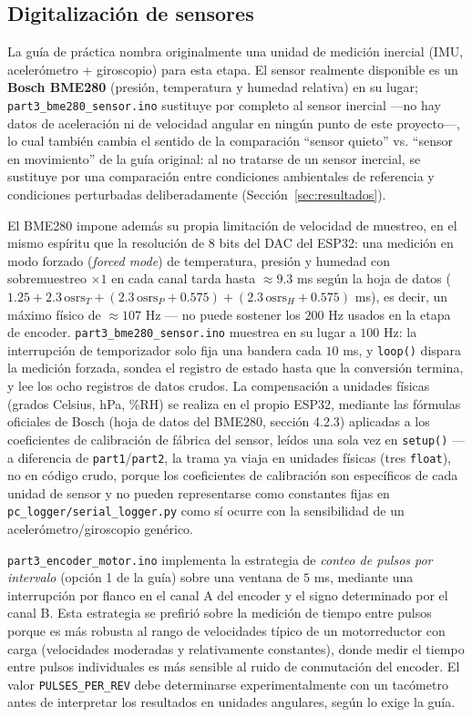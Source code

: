 \subsection{Digitalización de sensores}

La guía de práctica nombra originalmente una unidad de medición inercial (IMU, acelerómetro + giroscopio) para esta etapa. El sensor realmente disponible es un \textbf{Bosch BME280} (presión, temperatura y humedad relativa) en su lugar; \texttt{part3\_bme280\_sensor.ino} sustituye por completo al sensor inercial —no hay datos de aceleración ni de velocidad angular en ningún punto de este proyecto—, lo cual también cambia el sentido de la comparación ``sensor quieto'' vs. ``sensor en movimiento'' de la guía original: al no tratarse de un sensor inercial, se sustituye por una comparación entre condiciones ambientales de referencia y condiciones perturbadas deliberadamente (Sección~\ref{sec:resultados}).

El BME280 impone además su propia limitación de velocidad de muestreo, en el mismo espíritu que la resolución de $8$ bits del DAC del ESP32: una medición en modo forzado (\emph{forced mode}) de temperatura, presión y humedad con sobremuestreo $\times 1$ en cada canal tarda hasta $\approx 9.3$ ms según la hoja de datos ($1.25 + 2.3\,\text{osrs}_T + (2.3\,\text{osrs}_P + 0.575) + (2.3\,\text{osrs}_H + 0.575)$ ms), es decir, un máximo físico de $\approx 107$ Hz — no puede sostener los $200$ Hz usados en la etapa de encoder. \texttt{part3\_bme280\_sensor.ino} muestrea en su lugar a $100$ Hz: la interrupción de temporizador solo fija una bandera cada $10$ ms, y \texttt{loop()} dispara la medición forzada, sondea el registro de estado hasta que la conversión termina, y lee los ocho registros de datos crudos. La compensación a unidades físicas (grados Celsius, hPa, \%RH) se realiza en el propio ESP32, mediante las fórmulas oficiales de Bosch (hoja de datos del BME280, sección 4.2.3) aplicadas a los coeficientes de calibración de fábrica del sensor, leídos una sola vez en \texttt{setup()} — a diferencia de \texttt{part1}/\texttt{part2}, la trama ya viaja en unidades físicas (tres \texttt{float}), no en código crudo, porque los coeficientes de calibración son específicos de cada unidad de sensor y no pueden representarse como constantes fijas en \texttt{pc\_logger/serial\_logger.py} como sí ocurre con la sensibilidad de un acelerómetro/giroscopio genérico.

\texttt{part3\_encoder\_motor.ino} implementa la estrategia de \emph{conteo de pulsos por intervalo} (opción 1 de la guía) sobre una ventana de $5$ ms, mediante una interrupción por flanco en el canal A del encoder y el signo determinado por el canal B. Esta estrategia se prefirió sobre la medición de tiempo entre pulsos porque es más robusta al rango de velocidades típico de un motorreductor con carga (velocidades moderadas y relativamente constantes), donde medir el tiempo entre pulsos individuales es más sensible al ruido de conmutación del encoder. El valor \texttt{PULSES\_PER\_REV} debe determinarse experimentalmente con un tacómetro antes de interpretar los resultados en unidades angulares, según lo exige la guía.

